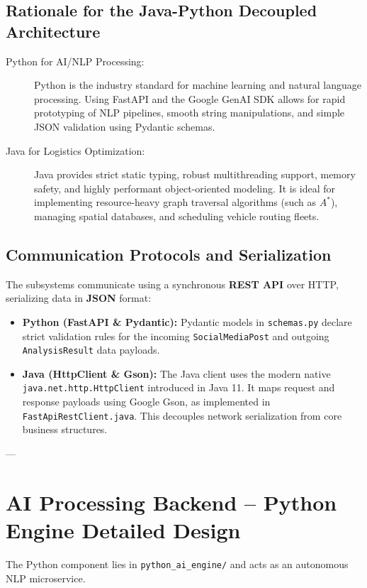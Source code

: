 \documentclass[12pt,a4paper]{article}
\begin{document}
\subsection{Rationale for the Java-Python Decoupled Architecture}
\begin{description}
    \item[Python for AI/NLP Processing:] Python is the industry standard for machine learning and natural language processing. Using FastAPI and the Google GenAI SDK allows for rapid prototyping of NLP pipelines, smooth string manipulations, and simple JSON validation using Pydantic schemas.
    \item[Java for Logistics Optimization:] Java provides strict static typing, robust multithreading support, memory safety, and highly performant object-oriented modeling. It is ideal for implementing resource-heavy graph traversal algorithms (such as $A^*$), managing spatial databases, and scheduling vehicle routing fleets.
\end{description}

\subsection{Communication Protocols and Serialization}
The subsystems communicate using a synchronous \textbf{REST API} over HTTP, serializing data in \textbf{JSON} format:
\begin{itemize}
    \item \textbf{Python (FastAPI \& Pydantic):} Pydantic models in \texttt{schemas.py} declare strict validation rules for the incoming \texttt{SocialMediaPost} and outgoing \texttt{AnalysisResult} data payloads.
    \item \textbf{Java (HttpClient \& Gson):} The Java client uses the modern native \texttt{java.net.http.HttpClient} introduced in Java 11. It maps request and response payloads using Google Gson, as implemented in \texttt{FastApiRestClient.java}. This decouples network serialization from core business structures.
\end{itemize}

---

\section{AI Processing Backend -- Python Engine Detailed Design}

The Python component lies in \texttt{python\_ai\_engine/} and acts as an autonomous NLP microservice.
\end{document}
